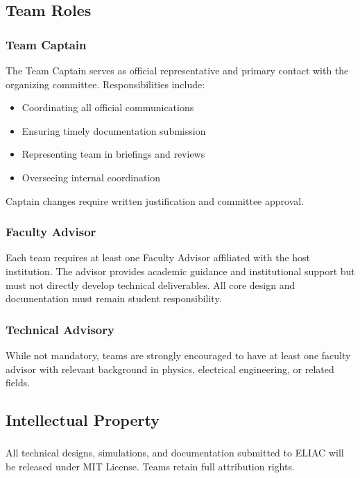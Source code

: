 \subsection{Team Roles}

\subsubsection{Team Captain}
The Team Captain serves as official representative and primary contact with the organizing committee. Responsibilities include:
\begin{itemize}[noitemsep]
    \item Coordinating all official communications
    \item Ensuring timely documentation submission
    \item Representing team in briefings and reviews
    \item Overseeing internal coordination
\end{itemize}

Captain changes require written justification and committee approval.

\subsubsection{Faculty Advisor}
Each team requires at least one Faculty Advisor affiliated with the host institution. The advisor provides academic guidance and institutional support but must not directly develop technical deliverables. All core design and documentation must remain student responsibility.

\subsubsection{Technical Advisory}
While not mandatory, teams are strongly encouraged to have at least one faculty advisor with relevant background in physics, electrical engineering, or related fields.

\subsection{Intellectual Property}

\subsubsection{}
All technical designs, simulations, and documentation submitted to ELIAC will be released under MIT License. Teams retain full attribution rights.

